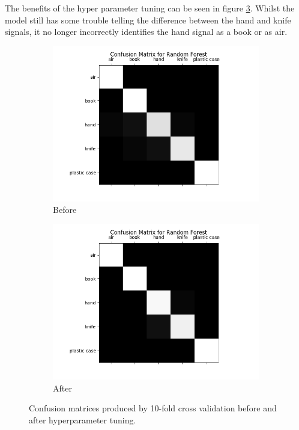 \documentclass[12pt]{article}
\begin{document}
The benefits of the hyper parameter tuning can be seen in figure \ref{fig:beforeandafterrf}. Whilst the model still has some trouble telling the difference between the hand and knife signals, it no longer incorrectly identifies the hand signal as a book or as air.

\begin{figure}[!ht]
\centering
\begin{subfigure}{.5\textwidth}
  \centering
  \includegraphics[width=\linewidth]{images/beforerf}
	\caption{Before}
  \label{fig:beforerf}
\end{subfigure}%
\begin{subfigure}{.5\textwidth}
  \centering
  \includegraphics[width=\linewidth]{images/afterrf}
  \caption{After}
  \label{fig:afterrf}
\end{subfigure}
\caption{Confusion matrices produced by 10-fold cross validation before and after hyperparameter tuning.}
\label{fig:beforeandafterrf}
\end{figure}
\end{document}
